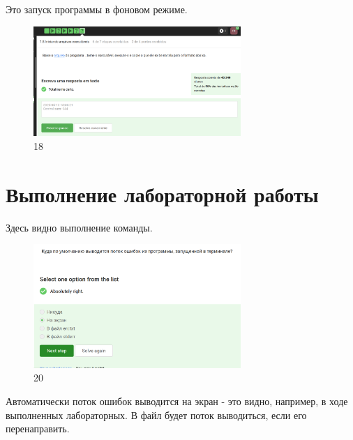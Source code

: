 Это запуск программы в фоновом режиме.

\begin{figure}
\hypertarget{fig:018}{%
\centering
\includegraphics[width=0.7\textwidth,height=\textheight]{image/18.png}
\caption{18}\label{fig:018}
}
\end{figure}

\hypertarget{ux432ux44bux43fux43eux43bux43dux435ux43dux438ux435-ux43bux430ux431ux43eux440ux430ux442ux43eux440ux43dux43eux439-ux440ux430ux431ux43eux442ux44b-14}{%
\section{Выполнение лабораторной
работы}\label{ux432ux44bux43fux43eux43bux43dux435ux43dux438ux435-ux43bux430ux431ux43eux440ux430ux442ux43eux440ux43dux43eux439-ux440ux430ux431ux43eux442ux44b-14}}

Здесь видно выполнение команды.

\begin{figure}
\hypertarget{fig:020}{%
\centering
\includegraphics[width=0.7\textwidth,height=\textheight]{image/20.png}
\caption{20}\label{fig:020}
}
\end{figure}

Автоматически поток ошибок выводится на экран - это видно, например, в
ходе выполненных лабораторных. В файл будет поток выводиться, если его
перенаправить.

